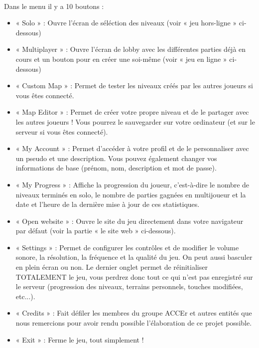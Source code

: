 \documentclass[titlepage, 13px, a4paper]{report}
\begin{document}
\paragraph*{} \hspace{0pt}
Dans le menu il y a 10 boutons : \\
{\begin{itemize}
	\item « Solo » : Ouvre l'écran de séléction des niveaux (voir « jeu hors-ligne » ci-dessous)
	\item « Multiplayer » : Ouvre l'écran de lobby avec les différentes parties déjà en cours et 
		un bouton pour en créer une soi-même (voir « jeu en ligne » ci-dessous)
	\item « Custom Map » : Permet de tester les niveaux créés par les autres joueurs si vous êtes connecté.
	\item « Map Editor » : Permet de créer votre propre niveau et de le partager avec les autres joueurs ! 
		Vous pourrez le sauvegarder sur votre ordinateur (et sur le serveur si vous êtes connecté).
	\item « My Account » :  Permet d'accéder à votre profil et de le personnaliser avec un pseudo et une description. 
		Vous pouvez également changer vos informations de base (prénom, nom, description et mot de passe).
	\item « My Progress » : Affiche la progression du joueur, c'est-à-dire le nombre de niveaux terminés 
		en solo, le nombre de parties gagnées en multijoueur et la date et l'heure de la dernière mise à jour 
		de ces statistiques.
	\item « Open website » : Ouvre le site du jeu directement dans votre navigateur par défaut (voir la partie 
		« le site web » ci-dessous).
	\item « Settings » : Permet de configurer les contrôles et de modifier le volume sonore, la résolution, la fréquence 
		et la qualité du jeu. On peut aussi basculer en plein écran ou non. Le dernier onglet permet de réinitialiser 
		TOTALEMENT le jeu, vous perdrez donc tout ce qui n'est pas enregistré sur le serveur (progression des niveaux, 
		terrains personnels, touches modifiées, etc...).
	\item « Credits » : Fait défiler les membres du groupe ACCEr et autres entités que nous remercions pour avoir 
		rendu possible l'élaboration de ce projet possible.
	\item « Exit » :  Ferme le jeu, tout simplement !  \\
\end{itemize}}
\end{document}
